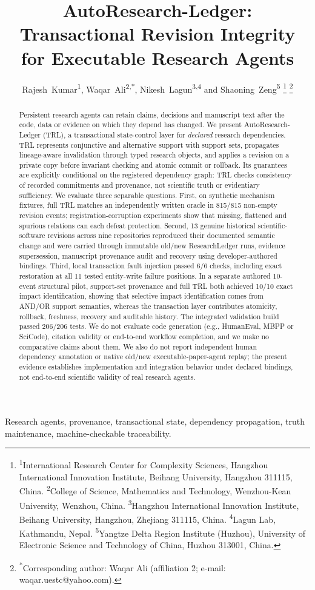 \documentclass[journal]{IEEEtran}
\title{AutoResearch-Ledger: Transactional Revision Integrity for Executable Research Agents}
\author{
    Rajesh~Kumar\textsuperscript{1}, %
    Waqar~Ali\textsuperscript{2,*}, %
    Nikesh~Lagun\textsuperscript{3,4} and %
    Shaoning~Zeng\textsuperscript{5}%
    \thanks{\textsuperscript{1}International Research Center for Complexity Sciences, Hangzhou International Innovation Institute, Beihang University, Hangzhou 311115, China.
    \textsuperscript{2}College of Science, Mathematics and Technology, Wenzhou-Kean University, Wenzhou, China.
    \textsuperscript{3}Hangzhou International Innovation Institute, Beihang University, Hangzhou, Zhejiang 311115, China.
    \textsuperscript{4}Lagun Lab, Kathmandu, Nepal.
    \textsuperscript{5}Yangtze Delta Region Institute (Huzhou), University of Electronic Science and Technology of China, Huzhou 313001, China.}%
    \thanks{\textsuperscript{*}Corresponding author: Waqar Ali (affiliation 2; e-mail: waqar.uestc@yahoo.com).}%
}
\begin{document}
\maketitle

\begin{abstract}
Persistent research agents can retain claims, decisions and manuscript text after the code, data or evidence on which they depend has changed. We present AutoResearch-Ledger (TRL), a transactional state-control layer for \emph{declared} research dependencies. TRL represents conjunctive and alternative support with support sets, propagates lineage-aware invalidation through typed research objects, and applies a revision on a private copy before invariant checking and atomic commit or rollback. Its guarantees are explicitly conditional on the registered dependency graph: TRL checks consistency of recorded commitments and provenance, not scientific truth or evidentiary sufficiency. We evaluate three separable questions. First, on synthetic mechanism fixtures, full TRL matches an independently written oracle in 815/815 non-empty revision events; registration-corruption experiments show that missing, flattened and spurious relations can each defeat protection. Second, 13 genuine historical scientific-software revisions across nine repositories reproduced their documented semantic change and were carried through immutable old/new ResearchLedger runs, evidence supersession, manuscript provenance audit and recovery using developer-authored bindings. Third, local transaction fault injection passed 6/6 checks, including exact restoration at all 11 tested entity-write failure positions. In a separate authored 10-event structural pilot, support-set provenance and full TRL both achieved 10/10 exact impact identification, showing that selective impact identification comes from AND/OR support semantics, whereas the transaction layer contributes atomicity, rollback, freshness, recovery and auditable history. The integrated validation build passed 206/206 tests. We do not evaluate code generation (e.g., HumanEval, MBPP or SciCode), citation validity or end-to-end workflow completion, and we make no comparative claims about them. We also do not report independent human dependency annotation or native old/new executable-paper-agent replay; the present evidence establishes implementation and integration behavior under declared bindings, not end-to-end scientific validity of real research agents.
\end{abstract}

\begin{IEEEkeywords}
Research agents, provenance, transactional state, dependency propagation, truth maintenance, machine-checkable traceability.
\end{IEEEkeywords}
\end{document}
